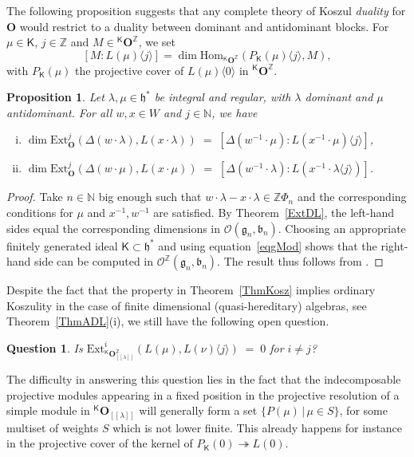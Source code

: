 \documentclass[11pt]{amsart}
\newcommand{\lbra}{[\![}
\newcommand{\rbra}{]\!]}
\newcommand{\KKK}{\mathsf{K}}
\newcommand{\rR}{\Phi}
\newcommand{\tto}{\twoheadrightarrow}
\newcommand{\cO}{\mathcal O}
\newcommand{\bO}{\mathbf{O}}
\newcommand{\Hom}{\mathrm{Hom}}
\newcommand{\Ext}{\mathrm{Ext}}
\newcommand{\fg}{\mathfrak{g}}
\newcommand{\fh}{\mathfrak{h}}
\newcommand{\fb}{\mathfrak{b}}
\newcommand{\mN}{\mathbb{N}}
\newcommand{\mZ}{\mathbb{Z}}
\numberwithin{equation}{section}
\theoremstyle{plain}
\newtheorem{prop}[subsubsection]{Proposition}
\newtheorem{que}[subsubsection]{Question}
\theoremstyle{remark}
\theoremstyle{remark}
\theoremstyle{construction}
\begin{document}
The following proposition suggests that any complete theory of Koszul {\em duality} for $\bO$ would restrict to a duality between dominant and antidominant blocks. For $\mu\in\KKK$, $j\in\mZ$ and
$M\in {}^{\KKK}\bO^{\mZ}$, we set
$$[M:L(\mu)\langle j\rangle]=\dim\Hom_{{}^{\KKK}\bO^{\mZ}}(P_{\KKK}(\mu)\langle j\rangle ,M),$$
with $P_{\KKK}(\mu)$ the projective cover of $L(\mu)\langle 0\rangle$ in ${}^{\KKK}\bO^{\mZ}$.
\begin{prop}
Let $\lambda,\mu\in\fh^\ast$ be integral and regular, with $\lambda$ dominant and $\mu$ antidominant. For all $w,x\in W$ and $j\in\mN$, we have
\begin{enumerate}[(i)]
\item  $\dim\Ext^j_{\bO}(\Delta(w\cdot\lambda),L(x\cdot\lambda))\;=\; [\Delta(w^{-1}\cdot\mu):L(x^{-1}\cdot\mu)\langle j\rangle]$,
\item $\dim\Ext^j_{\bO}(\Delta(w\cdot\mu),L(x\cdot\mu))\;=\; [\Delta(w^{-1}\cdot\lambda):L(x^{-1}\cdot\lambda\langle j\rangle)]$.
\end{enumerate}
\end{prop}
\begin{proof}
Take $n\in\mN$ big enough such that $w\cdot\lambda-x\cdot\lambda\in\mZ\rR_n$ and the corresponding conditions for $\mu$ and $x^{-1},w^{-1}$ are satisfied. By Theorem~\ref{ExtDL}, the left-hand sides equal the corresponding dimensions in $\cO(\fg_n,\fb_n)$. Choosing an appropriate finitely generated ideal $\KKK\subset\fh^\ast$ and using equation~\eqref{eqgMod} shows that the right-hand side can be computed in $\cO^{\mZ}(\fg_n,\fb_n)$. The result thus follows from \cite[Proposition~1.3.1]{BGS}.
\end{proof}

Despite the fact that the property in Theorem~\ref{ThmKosz} implies ordinary Koszulity in the case of finite dimensional (quasi-hereditary) algebras, see Theorem~\ref{ThmADL}(i), we still have the following open question.
\begin{que}
{Is} 
$\Ext^i_{{}^{\KKK}\bO_{\lbra\lambda\rbra}^{\mZ}}(L(\mu),L(\nu)\langle j\rangle)\;=\;0$ {for} $i\not=j$?
\end{que}
The difficulty in answering this question lies in the fact that the indecomposable projective modules appearing in a fixed position in the projective resolution of a simple module in ${}^{\KKK}\bO_{\lbra\lambda\rbra}$ will generally form a set $\{P(\mu)\,|\,\mu\in S\}$, for some multiset of weights $S$ which is not lower finite. This already happens for instance in the projective cover of the kernel of $P_{\KKK}(0)\tto L(0)$.
\end{document}
